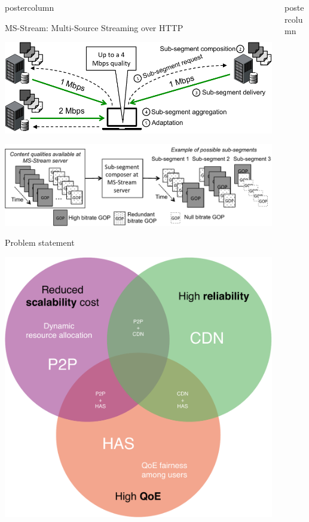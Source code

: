 \begin{frame}
\begin{columns}
\begin{column}{.49\textwidth}
\begin{beamercolorbox}[center,wd=\textwidth]{postercolumn}
\begin{minipage}[T]{.95\textwidth}
{\begin{block}{MS-Stream: Multi-Source Streaming over HTTP}
            \centering
            
            \includegraphics[width=.925\textwidth]{sample/msstream_archi.pdf}
            
            \includegraphics[width=.925\textwidth]{sample/chunk2.pdf}
            
            \end{block}
            
            \vfill
            
            \begin{block}{Problem statement}
            
            \centering
            
            \includegraphics[width=.5\textwidth]{sample/SotA-cropped.pdf}
            
            \end{block}
            
          }
        \end{minipage}
      \end{beamercolorbox}
    \end{column}
    \begin{column}{.49\textwidth}
      \begin{beamercolorbox}[center,wd=\textwidth]{postercolumn}
        \begin{minipage}[T]{.95\textwidth}
          \parbox[t][\columnheight]{\textwidth}{
            
}
\end{minipage}
\end{beamercolorbox}
\end{column}
\end{columns}
\end{frame}
